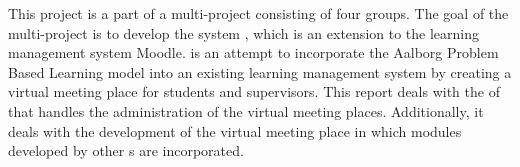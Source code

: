 This project is a part of a multi-project consisting of four groups.
The goal of the multi-project is to develop the system \system{}, which is an extension to the learning management system Moodle.
\system{} is an attempt to incorporate the Aalborg Problem Based Learning model into an existing learning management system by creating a virtual meeting place for students and supervisors.
This report deals with the \subsystem{} of \system{} that handles the administration of the virtual meeting places.
Additionally, it deals with the development of the virtual meeting place in which modules developed by other \subgroup{}s are incorporated.